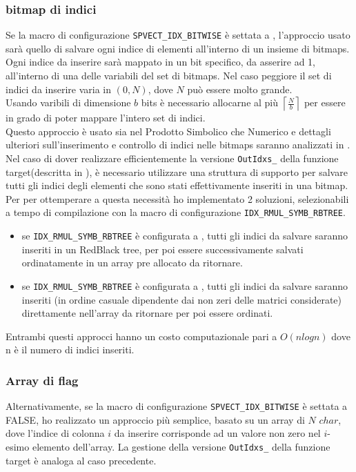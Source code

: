 \subsubsection{bitmap di indici}		\label{chSpMMSymb:bitmapsUse}
Se la macro di configurazione \verb|SPVECT_IDX_BITWISE| è settata a , l'approccio usato sarà quello 
di salvare ogni indice di elementi \nnz all'interno di un insieme di bitmaps.\\
Ogni indice da inserire sarà mappato in un bit specifico, da asserire ad 1, all'interno di una delle variabili del set di bitmaps.
Nel caso peggiore il set di indici da inserire varia in $(0,N)$, dove $N$ può essere molto grande.\\ 
Usando varibili di dimensione $b$ bits è necessario allocarne al più $\left\lceil \frac{N}{b}  \right\rceil$
per essere in grado di poter mappare l'intero set di indici.\\
Questo approccio è usato sia nel Prodotto Simbolico che Numerico e dettagli ulteriori sull'inserimento e controllo 
di indici nelle bitmaps saranno analizzati in .\\
Nel caso di dover realizzare efficientemente la versione \verb|OutIdxs_| della funzione target(descritta in ), 
è necessario utilizzare una struttura di supporto per salvare tutti gli indici degli elementi \nnz
 che sono stati effettivamente inseriti in una bitmap.
Per per ottemperare a questa necessità ho implementato 2 soluzioni, selezionabili a tempo di compilazione con
la macro di configurazione \verb|IDX_RMUL_SYMB_RBTREE|.\\
\begin{itemize}
	\item se \verb|IDX_RMUL_SYMB_RBTREE| è configurata a , tutti gli indici da salvare saranno 
		  inseriti in un RedBlack tree, per poi essere successivamente salvati ordinatamente in un array pre allocato
		  da ritornare.
	\item se \verb|IDX_RMUL_SYMB_RBTREE| è configurata a , tutti gli indici da salvare saranno inseriti
		  (in ordine casuale dipendente dai non zeri delle matrici considerate) direttamente nell'array da ritornare
		  per poi essere ordinati.
\end{itemize}
Entrambi questi approcci hanno un costo computazionale pari a $O(n log n)$ dove n è il numero di indici inseriti.\\

\subsubsection{Array di flag}
Alternativamente, se la macro di configurazione \verb|SPVECT_IDX_BITWISE| è settata a FALSE, 
ho realizzato un approccio più semplice, basato su un array di $N$ $char$, 
dove l'indice di colonna $i$ da inserire corrisponde ad un valore non zero nel $i$-esimo elemento dell'array.
La gestione della versione \verb|OutIdxs_| della funzione target è analoga al caso precedente.\\  %

